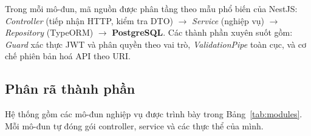 Trong mỗi mô-đun, mã nguồn được phân tầng theo mẫu phổ biến của NestJS:
\textit{Controller} (tiếp nhận HTTP, kiểm tra DTO) $\rightarrow$
\textit{Service} (nghiệp vụ) $\rightarrow$ \textit{Repository} (TypeORM) $\rightarrow$
\textbf{PostgreSQL}. Các thành phần xuyên suốt gồm: \textit{Guard} xác thực
JWT và phân quyền theo vai trò, \textit{ValidationPipe} toàn cục, và cơ chế
phiên bản hoá API theo URI.


\subsection{Phân rã thành phần}
\label{subsec:phan-ra-thanh-phan}

Hệ thống gồm các mô-đun nghiệp vụ được trình bày trong
Bảng~\ref{tab:modules}. Mỗi mô-đun tự đóng gói controller, service và các
thực thể của mình.

